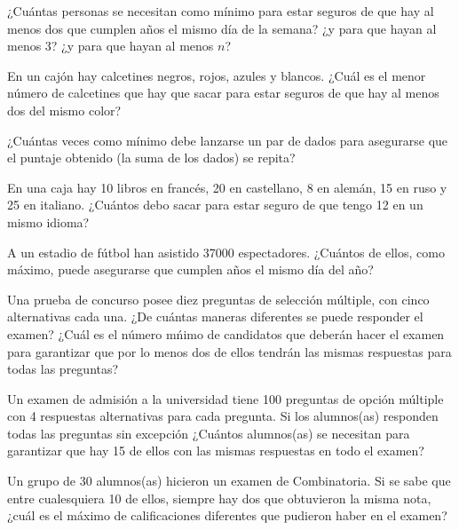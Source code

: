 \documentclass[12pt]{article}
\begin{document}
\begin{problema}
    ¿Cuántas personas se necesitan como mínimo para estar seguros de que hay al menos dos que cumplen años el mismo día de la semana? ¿y para que hayan al menos 3? ¿y para que hayan al menos $n$?
\end{problema}

\begin{problema}
    En un cajón hay calcetines negros, rojos, azules y blancos. ¿Cuál es el menor número de calcetines que hay que sacar para estar seguros de que hay al menos dos del mismo color?
\end{problema}

\begin{problema}
    ¿Cuántas veces como mínimo debe lanzarse un par de dados para asegurarse que el puntaje obtenido (la suma de los dados) se repita?
\end{problema}

\begin{problema}
    En una caja hay 10 libros en francés, 20 en castellano, 8 en alemán, 15 en ruso y 25 en italiano. ¿Cuántos debo sacar para estar seguro de que tengo 12 en un mismo idioma?
\end{problema}

\begin{problema}
    A un estadio de fútbol han asistido 37000 espectadores. ¿Cuántos de ellos, como máximo, puede asegurarse que cumplen años el mismo día del año?
\end{problema}

\begin{problema}
    Una prueba de concurso posee diez preguntas de selección múltiple, con cinco alternativas cada una. ¿De cuántas maneras diferentes se puede responder el examen? ¿Cuál es el número mńimo de candidatos que deberán hacer el examen para garantizar que por lo menos dos de ellos tendrán las mismas respuestas para todas las preguntas?
\end{problema}

\begin{problema}
    Un examen de admisión a la universidad tiene 100 preguntas de opción múltiple con 4 respuestas alternativas para cada pregunta. Si los alumnos(as) responden todas las preguntas sin excepción ¿Cuántos alumnos(as) se necesitan para garantizar que hay 15 de ellos con las mismas respuestas en todo el examen?
\end{problema}

\begin{problema}
    Un grupo de 30 alumnos(as) hicieron un examen de Combinatoria. Si se sabe que entre cualesquiera 10 de ellos, siempre hay dos que obtuvieron la misma nota, ¿cuál es el máximo de calificaciones diferentes que pudieron haber en el examen?
\end{problema}
\end{document}
